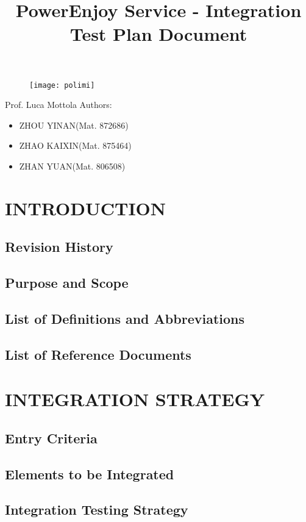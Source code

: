 \documentclass{article}
\title{PowerEnjoy Service - Integration Test Plan Document}
\begin{document}
\begin{titlepage}
\begin{figure}
	\centering
	\texttt{[image: polimi]}
\end{figure}
\maketitle
\centering
Prof. Luca Mottola
\newline
\raggedleft
Authors:
\begin{itemize}
	\raggedleft
	\item ZHOU YINAN(Mat. 872686)
	\item ZHAO KAIXIN(Mat. 875464)
	\item ZHAN YUAN(Mat. 806508)	
\end{itemize}
\end{titlepage}

\tableofcontents
\newpage

\section{INTRODUCTION}
 \subsection{Revision History}
 \subsection{Purpose and Scope}
 \subsection{List of Definitions and Abbreviations}
 \subsection{List of Reference Documents}
\newpage

\section{INTEGRATION STRATEGY}
 \subsection{Entry Criteria}
 \subsection{Elements to be Integrated}
 \subsection{Integration Testing Strategy}
\end{document}
